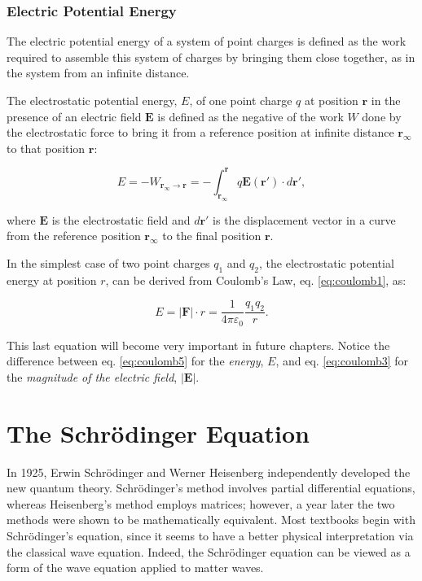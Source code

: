 \documentclass[
  9pt,
]{extbook}
\theoremstyle{definition}
\theoremstyle{definition}
\theoremstyle{definition}
\theoremstyle{remark}
\begin{document}
\hypertarget{electric-potential-energy}{%
\subsection{Electric Potential Energy}\label{electric-potential-energy}}

The electric potential energy of a system of point charges is defined as the work required to assemble this system of charges by bringing them close together, as in the system from an infinite distance.

The electrostatic potential energy, \(E\), of one point charge \(q\) at position \(\mathbf{r}\) in the presence of an electric field \(\mathbf{E}\) is defined as the negative of the work \(W\) done by the electrostatic force to bring it from a reference position at infinite distance \(\mathbf{r}_{\infty}\) to that position \(\mathbf{r}\):

\begin{equation}
{\displaystyle E=-W_{\mathbf{r}_{\infty}\rightarrow \mathbf{r}}=-\int _{{\mathbf {r}}_{\infty}}^{\mathbf {r} }q\mathbf {E} (\mathbf {r'} )\cdot d \mathbf {r'} },
\label{eq:coulomb4}
\end{equation}

where \(\mathbf{E}\) is the electrostatic field and \(d\mathbf{r'}\) is the displacement vector in a curve from the reference position \(\mathbf{r}_{\infty}\) to the final position \(\mathbf{r}\).

In the simplest case of two point charges \(q_1\) and \(q_2\), the electrostatic potential energy at position \(r\), can be derived from Coulomb's Law, eq. \eqref{eq:coulomb1}, as:

\begin{equation}
{\displaystyle E=|\mathbf{F}|\cdot r = {\frac{1}{4\pi\varepsilon_0}}{\frac{q_1q_2}{r}}}.
\label{eq:coulomb5}
\end{equation}

This last equation will become very important in future chapters. Notice the difference between eq. \eqref{eq:coulomb5} for the \emph{energy}, \(E\), and eq. \eqref{eq:coulomb3} for the \emph{magnitude of the electric field}, \(|\mathbf{E}|\).

\hypertarget{Schrodinger}{%
\chapter{The Schrödinger Equation}\label{Schrodinger}}

In 1925, Erwin Schrödinger and Werner Heisenberg independently developed the new quantum theory. Schrödinger's method involves partial differential equations, whereas Heisenberg's method employs matrices; however, a year later the two methods were shown to be mathematically equivalent. Most textbooks begin with Schrödinger's equation, since it seems to have a better physical interpretation via the classical wave equation. Indeed, the Schrödinger equation can be viewed as a form of the wave equation applied to matter waves.
\end{document}
